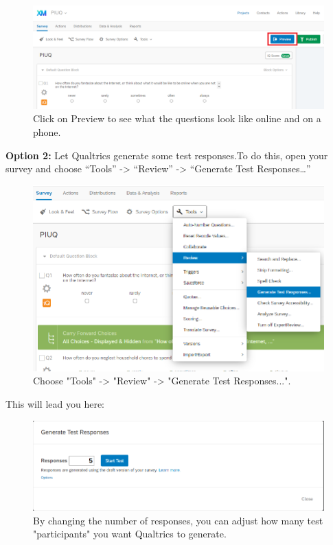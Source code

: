 \documentclass[
]{book}
\begin{document}
\begin{figure}

{\centering \includegraphics[width=0.85\linewidth]{images/Qualtrics/08Preview} 

}

\caption{Click on Preview to see what the questions look like online and on a phone.}\label{fig:Figure11-7}
\end{figure}

\textbf{Option 2:} Let Qualtrics generate some test responses.To do this, open your survey and choose ``Tools'' -\textgreater{} ``Review'' -\textgreater{} ``Generate Test Responses\ldots{}''

\begin{figure}

{\centering \includegraphics[width=0.85\linewidth]{images/Qualtrics/09testresponses1} 

}

\caption{Choose "Tools" -> "Review" -> "Generate Test Responses...".}\label{fig:Figure11-8}
\end{figure}

This will lead you here:

\begin{figure}

{\centering \includegraphics[width=0.85\linewidth]{images/Qualtrics/10testresponses2} 

}

\caption{By changing the number of responses, you can adjust how many test "participants" you want Qualtrics to generate.}\label{fig:Figure11-9}
\end{figure}
\end{document}
